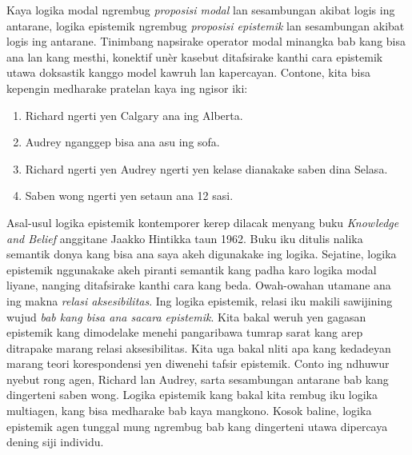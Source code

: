 \documentclass[../../../include/open-logic-section]{subfiles}
\begin{document}


Kaya logika modal ngrembug \emph{proposisi modal} lan sesambungan
akibat logis ing antarane, logika epistemik ngrembug
\emph{proposisi epistemik} lan sesambungan akibat logis ing antarane.
Tinimbang napsirake operator modal minangka bab kang bisa ana lan
kang mesthi, konektif unèr kasebut ditafsirake kanthi cara epistemik
utawa doksastik kanggo model kawruh lan kapercayan. Contone, kita
bisa kepengin medharake pratelan kaya ing ngisor iki:

\begin{enumerate}
\item Richard ngerti yen Calgary ana ing Alberta.
\item Audrey nganggep bisa ana asu ing sofa.
\item Richard ngerti yen Audrey ngerti yen kelase dianakake saben dina Selasa.
\item Saben wong ngerti yen setaun ana 12 sasi.
\end{enumerate}
Asal-usul logika epistemik kontemporer kerep dilacak menyang buku
\emph{Knowledge and Belief} anggitane Jaakko Hintikka taun 1962.
Buku iku ditulis nalika semantik donya kang bisa ana saya akeh digunakake
ing logika. Sejatine, logika epistemik nggunakake akeh piranti
semantik kang padha karo logika modal liyane, nanging ditafsirake
kanthi cara kang beda. Owah-owahan utamane ana ing makna
\emph{relasi aksesibilitas}. Ing logika epistemik, relasi iku makili
sawijining wujud \emph{bab kang bisa ana sacara epistemik}. Kita bakal weruh
yen gagasan epistemik kang dimodelake menehi pangaribawa tumrap sarat kang arep
ditrapake marang relasi aksesibilitas. Kita uga bakal nliti apa kang
kedadeyan marang teori korespondensi yen diwenehi tafsir epistemik.
Conto ing ndhuwur nyebut rong agen, Richard lan Audrey, sarta
sesambungan antarane bab kang dingerteni saben wong. Logika
epistemik kang bakal kita rembug iku logika multiagen, kang bisa
medharake bab kaya mangkono. Kosok baline, logika epistemik agen
tunggal mung ngrembug bab kang dingerteni utawa dipercaya dening
siji individu.
\end{document}
